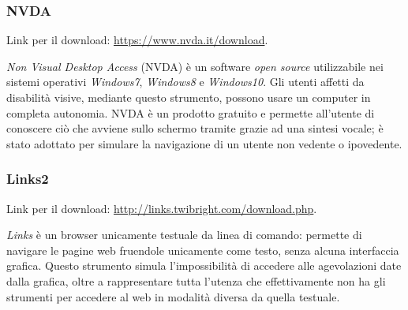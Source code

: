 \subsubsection{NVDA}
\label{test-strumenti-nvda}
Link per il download: \url{https://www.nvda.it/download}.

\textit{Non Visual Desktop Access} (NVDA) è un software \textit{open source} utilizzabile nei sistemi operativi \textit{Windows7}, \textit{Windows8} e \textit{Windows10}.
Gli utenti affetti da disabilità visive, mediante questo strumento, possono usare un computer in completa autonomia. NVDA è un prodotto gratuito e permette all'utente di conoscere ciò che avviene sullo schermo tramite grazie ad una sintesi vocale; è stato adottato per simulare la navigazione di un utente non vedente o ipovedente.

\subsubsection{Links2}
\label{test-strumenti-links2}
Link per il download: \url{http://links.twibright.com/download.php}.

\textit{Links} è un browser unicamente testuale da linea di comando: permette di navigare le pagine web fruendole unicamente come testo, senza alcuna interfaccia grafica. Questo strumento simula l'impossibilità di accedere alle agevolazioni date dalla grafica, oltre a rappresentare tutta l'utenza che effettivamente non ha gli strumenti per accedere al web in modalità diversa da quella testuale.

